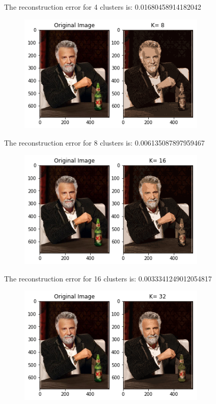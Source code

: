 \documentclass[11pt]{article}
\begin{document}
The reconstruction error for 4 clusters is: 0.01680458914182042

    
    \begin{figure}[H]
		\centering
		\includegraphics[width=0.8\textwidth]{./Project_2_files/Project_2_33_6.png}
	\end{figure}


The reconstruction error for 8 clusters is: 0.006135087897959467

    
    \begin{figure}[H]
		\centering
		\includegraphics[width=0.8\textwidth]{./Project_2_files/Project_2_33_9.png}
	\end{figure}


The reconstruction error for 16 clusters is: 0.0033341249012054817

    
    \begin{figure}[H]
		\centering
		\includegraphics[width=0.8\textwidth]{./Project_2_files/Project_2_33_12.png}
	\end{figure}
\end{document}
